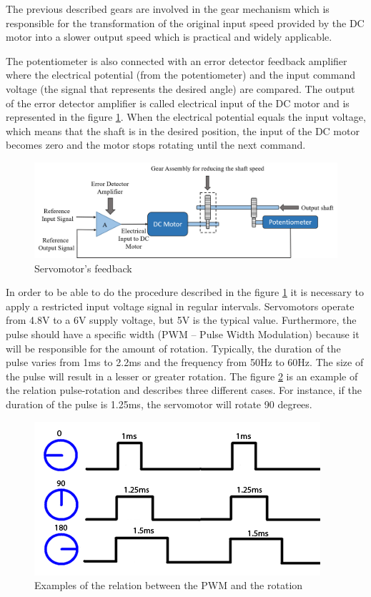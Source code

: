 The previous described gears are involved in the gear mechanism which is responsible for the transformation of the original input speed provided by the DC motor into a slower output speed which is practical and widely applicable. 

The potentiometer is also connected with an error detector feedback amplifier where the electrical potential (from the potentiometer) and the input command voltage (the signal that represents the desired angle) are compared. The output of the error detector amplifier is called electrical input of the DC motor and is represented in the figure \ref{servomotor_expl3}. When the electrical potential equals the input voltage, which means that the shaft is in the desired position, the input of the DC motor becomes zero and the motor stops rotating until the next command.

\begin{figure}[H]
\centerline{
\includegraphics[scale=0.6]{figures/servomotor_expl3new.png}}
\caption{Servomotor’s feedback}
\label{servomotor_expl3}
\end{figure}

In order to be able to do the procedure described in the figure \ref{servomotor_expl3} it is necessary to apply a restricted input voltage signal in regular intervals. Servomotors operate from 4.8V to a 6V supply voltage, but 5V is the typical value. Furthermore, the pulse should have a specific width (PWM – Pulse Width Modulation) because it will be responsible for the amount of rotation. Typically, the duration of the pulse varies from 1ms to 2.2ms and the frequency from 50Hz to 60Hz. The size of the pulse will result in a lesser or greater rotation. The figure \ref{signal_servo} is an example of the relation pulse-rotation and describes three different cases. For instance, if the duration of the pulse is 1.25ms, the servomotor will rotate 90 degrees.

\begin{figure}[H]
\centering
\includegraphics[scale=0.5]{figures/signal_servo.jpg}
\caption{Examples of the relation between the PWM and the rotation}
\label{signal_servo}
\end{figure}

